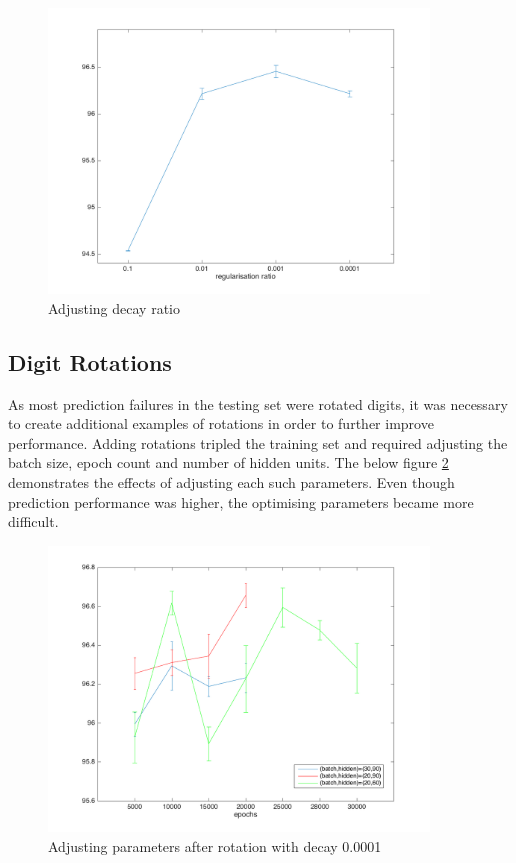 \documentclass[11]{article}
\begin{document}
\begin{figure}
\centering
\includegraphics[width=0.9\textwidth]{regularisation.png}
\caption{Adjusting decay ratio}
\label{fig:regularisation}
\end{figure}

\subsection{Digit Rotations}
As most prediction failures in the testing set were rotated digits, it was necessary to create additional examples of rotations in order to further improve performance. Adding rotations tripled the training set and required adjusting the batch size, epoch count and number of hidden units. The below figure \ref{fig:rotations} demonstrates the effects of adjusting each such parameters. Even though prediction performance was higher, the optimising parameters became more difficult. 

\begin{figure}
\centering
\includegraphics[width=0.9\textwidth]{rotations.png}
\caption{Adjusting parameters after rotation with decay 0.0001}
\label{fig:rotations}
\end{figure}
\end{document}
